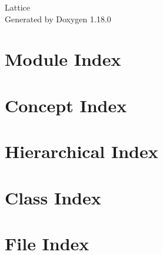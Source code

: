 \documentclass[twoside]{book}
\newcommand{\+}{\discretionary{\mbox{\scriptsize$\hookleftarrow$}}{}{}}
\newcommand{\clearemptydoublepage}{%
    \newpage{\pagestyle{empty}\cleardoublepage}%
  }
\begin{document}
  \raggedbottom
    \hypersetup{pageanchor=false,
                bookmarksnumbered=true,
                pdfencoding=unicode
               }
  \begin{titlepage}
  \vspace*{7cm}
  \begin{center}%
  {\Large Lattice}\\
  \vspace*{1cm}
  {\large Generated by Doxygen 1.18.0}\\
  \end{center}
  \end{titlepage}
  \clearemptydoublepage
  \tableofcontents
  \clearemptydoublepage
  \hypersetup{pageanchor=true}

\chapter{Module Index}

\chapter{Concept Index}

\chapter{Hierarchical Index}

\chapter{Class Index}

\chapter{File Index}

\end{document}
